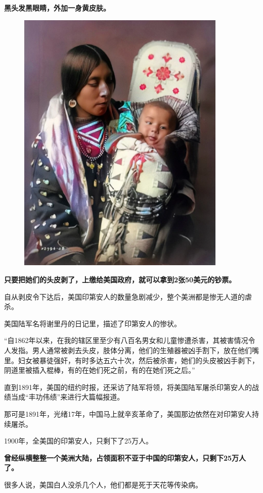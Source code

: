 \documentclass[UTF8, 11pt, oneside]{ctexart}
\newcommand{\zd}[1]{\textbf{\textcolor[RGB]{123,12,0}{#1}}} %
\newcommand{\yh}[1]{%
    \begin{tcolorbox}[enhanced,
        frame hidden, interior hidden,
        before skip = 5mm, left skip=10mm,
        borderline west={5pt}{0pt}{gray!50}]
        #1
    \end{tcolorbox}
}
\begin{document}
\zd{黑头发黑眼睛，外加一身黄皮肤。}

\begin{figure}[H]
    \centering
    \includegraphics[width=10cm]{2023-10-13-008}
\end{figure}

\zd{只要把她们的头皮剥了，上缴给美国政府，就可以拿到2张50美元的钞票。}

自从剥皮令下达后，美国印第安人的数量急剧减少，整个美洲都是惨无人道的虐杀。

美国陆军名将谢里丹的日记里，描述了印第安人的惨状。

\yh{
    “自1862年以来，在我的辖区里至少有八百名男女和儿童惨遭杀害，其被害情况令人发指。男人通常被剥去头皮，肢体分离，他们的生殖器被凶手割下，放在他们嘴里。妇女被暴徒强奸，有时多达五六十次，然后被杀害，她们的头皮被凶手剥下，阴道里被插入棍棒，有的在她们死之前，有的在她们死之后。”
}

直到1891年，美国的纽约时报，还采访了陆军将领，将美国陆军屠杀印第安人的战绩当成“丰功伟绩”来进行大篇幅报道。

那可是1891年，光绪17年，中国马上就辛亥革命了，美国那边依然在对印第安人持续屠杀。

1900年，全美国的印第安人，只剩下了25万人。

\zd{曾经纵横整整一个美洲大陆，占领面积不亚于中国的印第安人，只剩下25万人了。}

很多人说，美国白人没杀几个人，他们都是死于天花等传染病。
\end{document}
